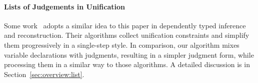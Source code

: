 \paragraph{Lists of Judgements in Unification}
Some work~\cite{Reed2009,Abel2011higher} adopts a similar idea to this paper
in dependently typed inference and reconstruction.
Their algorithms collect unification constraints and simplify them progressively in a single-step style.
In comparison, our algorithm mixes variable declarations with judgments,
resulting in a simpler judgment form,
while processing them in a similar way to those algorithms.
A detailed discussion is in Section~\ref{sec:overview:list}.


